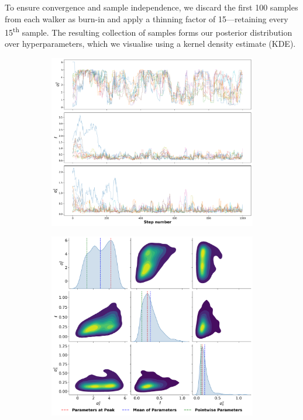 \documentclass{article}
\begin{document}
\noindent
To ensure convergence and sample independence, we discard the first 100 samples from each walker as burn-in and apply a thinning factor of 15—retaining every 15\textsuperscript{th} sample. The resulting collection of samples forms our posterior distribution over hyperparameters, which we visualise using a kernel density estimate (KDE).


\begin{figure}[H]
    \centering
    \begin{subfigure}[b]{0.48\textwidth}
        \centering
        \includegraphics[width=\textwidth]{LatexPlots/1dplots/MCMCwalkers.png}
    \end{subfigure}
    \hfill
    \begin{subfigure}[b]{0.48\textwidth}
        \centering
        \includegraphics[width=\textwidth]{LatexPlots/1dplots/MCMCdistribution.png}

\end{subfigure}
\end{figure}
\end{document}
